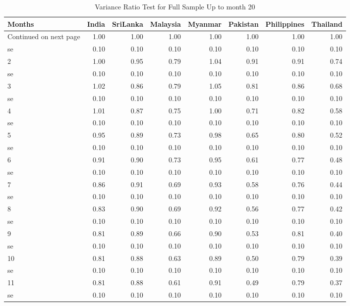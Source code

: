 \documentclass[11pt,preprint, authoryear]{elsarticle}
\numberwithin{equation}{section}
\numberwithin{figure}{section}
\numberwithin{table}{section}
\begin{document}
\begingroup\fontsize{12pt}{13pt}\selectfont
\begin{longtable}{lrrrrrrr}
\caption{Variance Ratio Test for Full Sample Up to month 20} \\ 
  \toprule
Months & India & SriLanka & Malaysia & Myanmar & Pakistan & Philippines & Thailand \\ 
  \hline 
\endhead 
\hline 
{\footnotesize Continued on next page} 
\endfoot 
\endlastfoot 
 \midrule
1 & 1.00 & 1.00 & 1.00 & 1.00 & 1.00 & 1.00 & 1.00 \\ 
  se & 0.10 & 0.10 & 0.10 & 0.10 & 0.10 & 0.10 & 0.10 \\ 
  2 & 1.00 & 0.95 & 0.79 & 1.04 & 0.91 & 0.91 & 0.74 \\ 
  se & 0.10 & 0.10 & 0.10 & 0.10 & 0.10 & 0.10 & 0.10 \\ 
  3 & 1.02 & 0.86 & 0.79 & 1.05 & 0.81 & 0.86 & 0.68 \\ 
  se & 0.10 & 0.10 & 0.10 & 0.10 & 0.10 & 0.10 & 0.10 \\ 
  4 & 1.01 & 0.87 & 0.75 & 1.00 & 0.71 & 0.82 & 0.58 \\ 
  se & 0.10 & 0.10 & 0.10 & 0.10 & 0.10 & 0.10 & 0.10 \\ 
  5 & 0.95 & 0.89 & 0.73 & 0.98 & 0.65 & 0.80 & 0.52 \\ 
  se & 0.10 & 0.10 & 0.10 & 0.10 & 0.10 & 0.10 & 0.10 \\ 
  6 & 0.91 & 0.90 & 0.73 & 0.95 & 0.61 & 0.77 & 0.48 \\ 
  se & 0.10 & 0.10 & 0.10 & 0.10 & 0.10 & 0.10 & 0.10 \\ 
  7 & 0.86 & 0.91 & 0.69 & 0.93 & 0.58 & 0.76 & 0.44 \\ 
  se & 0.10 & 0.10 & 0.10 & 0.10 & 0.10 & 0.10 & 0.10 \\ 
  8 & 0.83 & 0.90 & 0.69 & 0.92 & 0.56 & 0.77 & 0.42 \\ 
  se & 0.10 & 0.10 & 0.10 & 0.10 & 0.10 & 0.10 & 0.10 \\ 
  9 & 0.81 & 0.89 & 0.66 & 0.90 & 0.53 & 0.81 & 0.40 \\ 
  se & 0.10 & 0.10 & 0.10 & 0.10 & 0.10 & 0.10 & 0.10 \\ 
  10 & 0.81 & 0.88 & 0.63 & 0.89 & 0.50 & 0.79 & 0.39 \\ 
  se & 0.10 & 0.10 & 0.10 & 0.10 & 0.10 & 0.10 & 0.10 \\ 
  11 & 0.81 & 0.88 & 0.61 & 0.91 & 0.49 & 0.79 & 0.37 \\ 
  se & 0.10 & 0.10 & 0.10 & 0.10 & 0.10 & 0.10 & 0.10 \\ 

\end{longtable}
\end{document}
